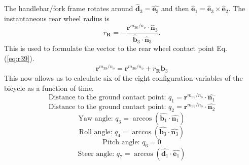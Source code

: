 The handlebar/fork frame rotates around $\hat{\mathbf{d}}_3=\hat{\mathbf{e}_3}$ and then $\hat{\mathbf{e}}_1=\hat{\mathbf{e}}_3\times\hat{\mathbf{e}}_2$. The instantaneous rear wheel radius is
\begin{equation}
    r_\mathbf{R}=-\frac{\mathbf{r}^{{m_{36}}/{n_o}}\cdot\hat{\mathbf{n}}_3}{\hat{\mathbf{b}}_3\cdot\hat{\mathbf{n}}_3}\textrm{.}
\label{eq:rr}
\end{equation}
This is used to formulate the vector to the rear wheel contact point Eq. (\ref{eq:r39}).
\begin{equation}
    \mathbf{r}^{{m_{39}}/{n_o}} = \mathbf{r}^{{m_{36}}/{n_o}}+r_\mathbf{R}\hat{\mathbf{b}_3}
\label{eq:r39}
\end{equation}
This now allows us to calculate six of the eight configuration variables of the bicycle as a function of time.
\begin{equation}
    \textrm{Distance to the ground contact point: }q_1 = \mathbf{r}^{{m_{39}}/{n_o}}\cdot\hat{\mathbf{n}_1}
\label{eq:q1}
\end{equation}
\begin{equation}
    \textrm{Distance to the ground contact point: }q_2 = \mathbf{r}^{{m_{39}}/{n_o}}\cdot\hat{\mathbf{n}_2}
\label{eq:q2}
\end{equation}
\begin{equation}
    \textrm{Yaw angle: }q_3 = \arccos\left(\hat{\mathbf{b}_1}\cdot\hat{\mathbf{n}_1}\right)
\label{eq:q3}
\end{equation}
\begin{equation}
    \textrm{Roll angle: }q_4 = \arccos\left(\hat{\mathbf{b}_3}\cdot\hat{\mathbf{n}_3}\right)
\label{eq:q4}
\end{equation}
\begin{equation}
    \textrm{Pitch angle: }q_6 = 0
\label{eq:q6}
\end{equation}
\begin{equation}
    \textrm{Steer angle: }q_7 = \arccos\left(\hat{\mathbf{d}_1}\cdot\hat{\mathbf{e}_1}\right)
\label{eq:q7}
\end{equation}


